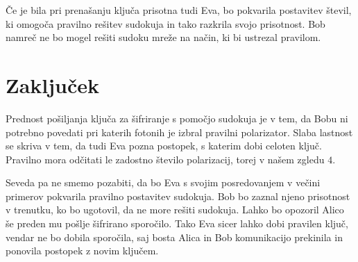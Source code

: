\documentclass[A4paper, 11pt]{article}
\begin{document}
Če je bila pri prenašanju ključa prisotna tudi Eva, bo pokvarila postavitev števil, ki omogoča pravilno rešitev sudokuja in tako razkrila svojo prisotnost. Bob namreč ne bo mogel rešiti sudoku mreže na način, ki bi ustrezal pravilom.



\section{Zaključek}

Prednost pošiljanja ključa za šifriranje s pomočjo sudokuja je v tem, da Bobu ni potrebno povedati pri katerih fotonih je izbral pravilni polarizator. Slaba lastnost se skriva v tem, da tudi Eva pozna postopek, s katerim dobi celoten ključ. Pravilno mora odčitati le zadostno število polarizacij, torej v našem zgledu $4$.

Seveda pa ne smemo pozabiti, da bo Eva s svojim posredovanjem v večini primerov pokvarila pravilno postavitev sudokuja. Bob bo zaznal njeno prisotnost v trenutku, ko bo ugotovil, da ne more rešiti sudokuja. Lahko bo opozoril Alico še preden mu pošlje šifrirano sporočilo. Tako Eva sicer lahko dobi pravilen ključ, vendar ne bo dobila sporočila, saj bosta Alica in Bob komunikacijo prekinila in ponovila postopek z novim ključem. 

\pagebreak

\end{document}
